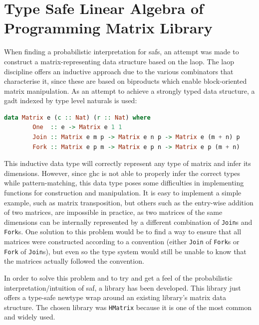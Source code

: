 \documentclass[
  oneside,
  11pt, a4paper,
  footinclude=true,
  headinclude=true,
  cleardoublepage=empty
]{scrbook}
\theoremstyle{definition}
\theoremstyle{definition}
\begin{document}
	    \section{Type Safe Linear Algebra of Programming Matrix Library}\label{sec-laop-lib1}
	    
	    When finding a probabilistic interpretation for \glspl{saf}, an attempt was made to construct a matrix-representing data structure based on the \gls{laop}. The \gls{laop} discipline offers an inductive approach due to the various combinators that characterise it, since these are based on %
	    biproducts which enable block-oriented matrix manipulation. As an attempt to achieve a strongly typed data structure, a \gls{gadt} indexed by type level naturals is used:
	    
        \begin{lstlisting}[language=Haskell, label={lst:nat-matrix}, caption={Inductive matrix definition},captionpos=b]
    data Matrix e (c :: Nat) (r :: Nat) where
        One  :: e -> Matrix e 1 1
        Join :: Matrix e m p -> Matrix e n p -> Matrix e (m + n) p
        Fork :: Matrix e p m -> Matrix e p n -> Matrix e p (m + n)
        \end{lstlisting}{}
        
        This inductive data type will correctly represent any type of matrix and infer its dimensions. However, since \gls{ghc} is not able to properly infer the correct types while pattern-matching, this data type poses some difficulties in implementing functions for construction and manipulation. It is easy to implement a simple example, such as matrix transposition, but others such as the entry-wise addition of two matrices, are impossible in practice, as two matrices of the same dimensions can be internally represented by a different combination of \texttt{Join}s and \texttt{Fork}s. One solution to this problem would be to find a way to ensure that all matrices were constructed according to a convention (either \texttt{Join} of \texttt{Fork}s or \texttt{Fork} of \texttt{Join}s), but even so the type system would still be unable to know that the matrices actually followed the convention.
	    
	    In order to solve this problem and to try and get a feel of the probabilistic interpretation/intuition of \gls{saf}, a library has been developed. This library just offers a type-safe newtype wrap around an existing library's matrix data structure. The chosen library was \texttt{HMatrix} \citep{hmatrix} because it is one of the most common and widely used.
	    
\end{document}
